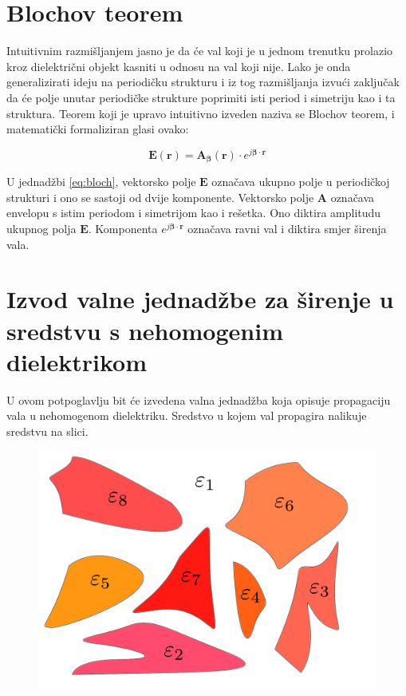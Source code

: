 \documentclass[utf8, seminar]{fer}
\begin{document}
\section{Blochov teorem}

Intuitivnim razmišljanjem jasno je da će val koji je u jednom trenutku prolazio
kroz dielektrični objekt kasniti u odnosu na val koji nije. Lako je onda
generalizirati ideju na periodičku strukturu i iz tog razmišljanja izvući
zaključak da će polje unutar periodičke strukture poprimiti isti period i
simetriju kao i ta struktura. Teorem koji je upravo intuitivno izveden naziva se
Blochov teorem, i matematički formaliziran glasi ovako:

\begin{equation} \label{eq:bloch}
	\mathbf{E}(\mathbf{r}) =
	\mathbf{A}_\mathbf{\beta}(\mathbf{r}) \cdot
		e^{j \mathbf{\beta} \cdot \mathbf{r}}
\end{equation}

U jednadžbi \ref{eq:bloch}, vektorsko polje $\mathbf{E}$ označava ukupno polje
u periodičkoj strukturi i ono se sastoji od dvije komponente. Vektorsko polje
$\mathbf{A}$ označava envelopu s istim periodom i simetrijom kao i rešetka.
Ono diktira amplitudu ukupnog polja $\mathbf{E}$.
Komponenta ${e^{j \mathbf{\beta} \cdot \mathbf{r}}}$ označava ravni val i diktira
smjer širenja vala.




\section{Izvod valne jednadžbe za širenje u sredstvu s nehomogenim dielektrikom}

U ovom potpoglavlju bit će izvedena valna jednadžba koja opisuje propagaciju
vala u nehomogenom dielektriku. Sredstvo u kojem val propagira nalikuje sredstvu
na slici.

\begin{figure}
	\centering
	\includegraphics[scale=0.5]{./images/structure-model.pdf}
\end{figure}
\end{document}
